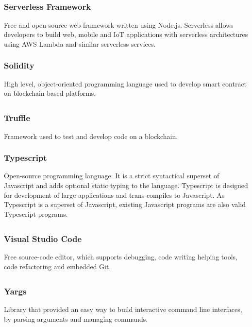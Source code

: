 	\subsection*{}
		\subsubsection*{Serverless Framework}
			Free and open-source web framework written using Node.js. Serverless allows developers to build web, mobile and IoT applications with serverless architectures using AWS Lambda and similar serverless services.
		\subsubsection*{Solidity}
			High level, object-oriented programming language used to develop smart contract on blockchain-based platforms.
		
	\subsection*{}
		\subsubsection*{Truffle}
			Framework used to test and develop code on a blockchain.
		\subsubsection*{Typescript}
			Open-source programming language. It is a strict syntactical superset of Javascript and adds optional static typing to the language. Typescript is designed for development of large applications and trans-compiles to Javascript. As Typescript is a superset of Javascript, existing Javascript programs are also valid Typescript programs.
			
	\subsection*{}
		\subsubsection*{Visual Studio Code}
			Free source-code editor, which supports debugging, code writing helping tools, code refactoring and embedded Git.
	
	\subsection*{}
		\subsubsection*{Yargs}
			Library that provided an easy way to build interactive command line interfaces, by parsing arguments and managing commands. 
	